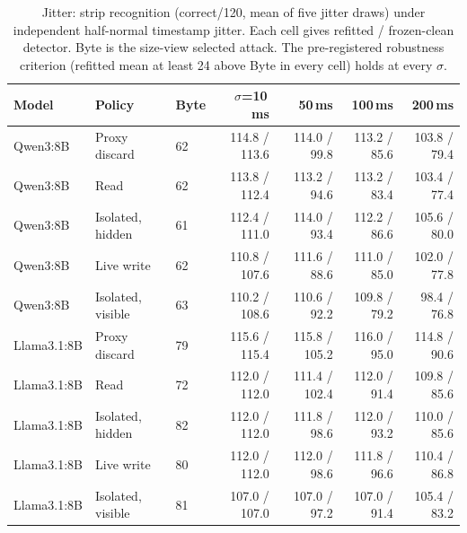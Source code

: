 \begin{table}[t]\centering\small
\caption{Jitter: strip recognition (correct/120, mean of five jitter draws) under independent half-normal timestamp jitter. Each cell gives refitted / frozen-clean detector. Byte is the size-view selected attack. The pre-registered robustness criterion (refitted mean at least 24 above Byte in every cell) holds at every $\sigma$.}\label{tab:c1}
\setlength{\tabcolsep}{4pt}
\begin{tabularx}{\textwidth}{@{}llYrrrr@{}}\toprule
Model & Policy & Byte & $\sigma$=10\,ms & 50\,ms & 100\,ms & 200\,ms\\\midrule
Qwen3:8B & Proxy discard & 62 & 114.8 / 113.6 & 114.0 / 99.8 & 113.2 / 85.6 & 103.8 / 79.4 \\
Qwen3:8B & Read & 62 & 113.8 / 112.4 & 113.2 / 94.6 & 113.2 / 83.4 & 103.4 / 77.4 \\
Qwen3:8B & Isolated, hidden & 61 & 112.4 / 111.0 & 114.0 / 93.4 & 112.2 / 86.6 & 105.6 / 80.0 \\
Qwen3:8B & Live write & 62 & 110.8 / 107.6 & 111.6 / 88.6 & 111.0 / 85.0 & 102.0 / 77.8 \\
Qwen3:8B & Isolated, visible & 63 & 110.2 / 108.6 & 110.6 / 92.2 & 109.8 / 79.2 & 98.4 / 76.8 \\
Llama3.1:8B & Proxy discard & 79 & 115.6 / 115.4 & 115.8 / 105.2 & 116.0 / 95.0 & 114.8 / 90.6 \\
Llama3.1:8B & Read & 72 & 112.0 / 112.0 & 111.4 / 102.4 & 112.0 / 91.4 & 109.8 / 85.6 \\
Llama3.1:8B & Isolated, hidden & 82 & 112.0 / 112.0 & 111.8 / 98.6 & 112.0 / 93.2 & 110.0 / 85.6 \\
Llama3.1:8B & Live write & 80 & 112.0 / 112.0 & 112.0 / 98.6 & 111.8 / 96.6 & 110.4 / 86.8 \\
Llama3.1:8B & Isolated, visible & 81 & 107.0 / 107.0 & 107.0 / 97.2 & 107.0 / 91.4 & 105.4 / 83.2 \\
\bottomrule\end{tabularx}
\end{table}
